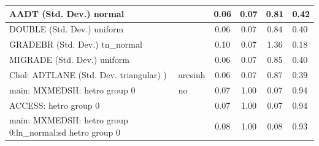 \begin{table}
\begin{center}
\begin{tabular}{|l|l|c|c|c|l|}
			\hline
			AADT (Std. Dev.) normal &  & 0.06 & 0.07 & 0.81 & 0.42 \\
			\hline
			DOUBLE (Std. Dev.) uniform &  & 0.06 & 0.07 & 0.84 & 0.40 \\
			\hline
			GRADEBR (Std. Dev.) tn_normal &  & 0.10 & 0.07 & 1.36 & 0.18 \\
			\hline
			MIGRADE (Std. Dev.) uniform &  & 0.06 & 0.07 & 0.85 & 0.40 \\
			\hline
			 Chol: ADTLANE (Std. Dev. triangular) ) & arcsinh & 0.06 & 0.07 & 0.87 & 0.39 \\
			\hline
			main: MXMEDSH: hetro group 0 & no & 0.07 & 1.00 & 0.07 & 0.94 \\
			\hline
			ACCESS: hetro group 0 &  & 0.07 & 1.00 & 0.07 & 0.94 \\
			\hline
			main: MXMEDSH: hetro group 0:ln_normal:sd  hetro group 0 &  & 0.08 & 1.00 & 0.08 & 0.93 \\
			\hline
		\end{tabular}
	\end{center}
\end{table}